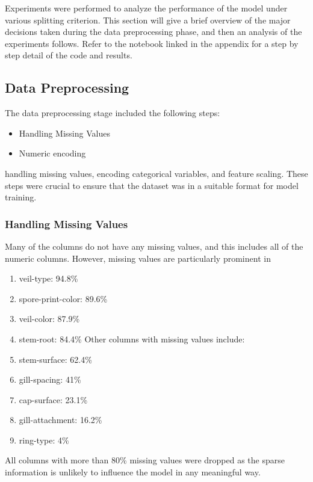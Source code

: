 \documentclass{article}
\begin{document}
Experiments were performed to analyze the performance of the model under various splitting criterion.
This section will give a brief overview of the major decisions taken during the data preprocessing phase, and then an analysis of the experiments follows. Refer to the notebook linked in the appendix for a step by step detail of the code and results.

\subsection{Data Preprocessing}

The data preprocessing stage included the following steps:
\begin{itemize}
    \item Handling Missing Values
    \item Numeric encoding
\end{itemize}
handling missing values, encoding categorical variables, and feature scaling. These steps were crucial to ensure that the dataset was in a suitable format for model training.

\subsubsection{Handling Missing Values}
Many of the columns do not have any missing values, and this includes all of the numeric columns. However, missing values are particularly prominent in 

\begin{enumerate}
    \item veil-type: 94.8\%
    \item spore-print-color: 89.6\%
    \item veil-color: 87.9\%
    \item stem-root: 84.4\%
Other columns with missing values include:
    \item stem-surface: 62.4\%
    \item gill-spacing: 41\%
    \item cap-surface: 23.1\%
    \item gill-attachment: 16.2\%
    \item ring-type: 4\%
\end{enumerate}

All columns with more than 80\% missing values were dropped as the sparse information is unlikely to influence the model in any meaningful way.
\end{document}
